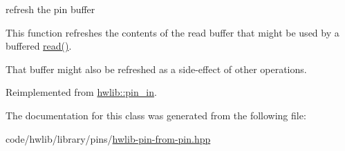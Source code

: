 refresh the pin buffer

This function refreshes the contents of the read buffer that might be used by a buffered \hyperlink{classhwlib_1_1pin__in__from__oc__t_a451b54793f3bfb713bd90edb115c9ef2}{read()}.

That buffer might also be refreshed as a side-\/effect of other operations. 

Reimplemented from \hyperlink{classhwlib_1_1pin__in_a3fb1bfb1ec962bb6d31a5e865f0d0acb}{hwlib\+::pin\+\_\+in}.



The documentation for this class was generated from the following file\+:\begin{DoxyCompactItemize}
\item 
code/hwlib/library/pins/\hyperlink{hwlib-pin-from-pin_8hpp}{hwlib-\/pin-\/from-\/pin.\+hpp}\end{DoxyCompactItemize}
